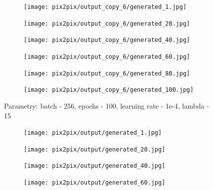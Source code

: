 \documentclass[12pt]{article}
\begin{document}
\begin{sloppypar}
{{    \begin{figure}[H]
      \begin{subfigure}{.5\textwidth}
        \centering
        \texttt{[image: pix2pix/output\_copy\_6/generated\_1.jpg]}
      \end{subfigure}%
      \begin{subfigure}{.5\textwidth}
        \centering
        \texttt{[image: pix2pix/output\_copy\_6/generated\_20.jpg]}
      \end{subfigure}
      \begin{subfigure}{.5\textwidth}
        \centering
        \texttt{[image: pix2pix/output\_copy\_6/generated\_40.jpg]}
      \end{subfigure}
      \begin{subfigure}{.5\textwidth}
        \centering
        \texttt{[image: pix2pix/output\_copy\_6/generated\_60.jpg]}
      \end{subfigure}
      \begin{subfigure}{.5\textwidth}
        \centering
        \texttt{[image: pix2pix/output\_copy\_6/generated\_80.jpg]}
      \end{subfigure}
      \begin{subfigure}{.5\textwidth}
        \centering
        \texttt{[image: pix2pix/output\_copy\_6/generated\_100.jpg]}
      \end{subfigure}
      \caption{Parametry: batch - 256, epochs - 100, learning rate - 1e-4, lambda - 15}
    \end{figure}
    \begin{figure}[H]
      \begin{subfigure}{.5\textwidth}
        \centering
        \texttt{[image: pix2pix/output/generated\_1.jpg]}
      \end{subfigure}%
      \begin{subfigure}{.5\textwidth}
        \centering
        \texttt{[image: pix2pix/output/generated\_20.jpg]}
      \end{subfigure}
      \begin{subfigure}{.5\textwidth}
        \centering
        \texttt{[image: pix2pix/output/generated\_40.jpg]}
      \end{subfigure}
      \begin{subfigure}{.5\textwidth}
        \centering
        \texttt{[image: pix2pix/output/generated\_60.jpg]}
      \end{subfigure}
      \begin{subfigure}{.5\textwidth}
        \centering

\end{subfigure}
\end{figure}}}
\end{sloppypar}
\end{document}
